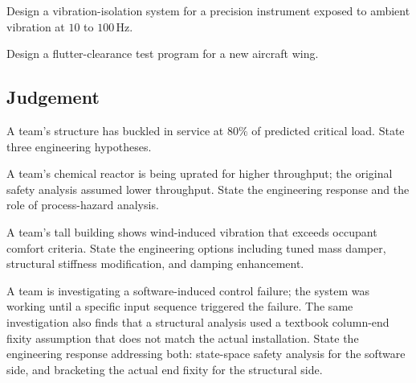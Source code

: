 \begin{exercise}
Design a vibration-isolation system for a precision instrument exposed to ambient vibration at $10$ to $100\,\text{Hz}$.
\end{exercise}

\begin{exercise}
Design a flutter-clearance test program for a new aircraft wing.
\end{exercise}

\subsection*{Judgement}

\begin{exercise}
A team's structure has buckled in service at $80\%$ of predicted critical load. State three engineering hypotheses.
\end{exercise}

\begin{exercise}
A team's chemical reactor is being uprated for higher throughput; the original safety analysis assumed lower throughput. State the engineering response and the role of process-hazard analysis.
\end{exercise}

\begin{exercise}
A team's tall building shows wind-induced vibration that exceeds occupant comfort criteria. State the engineering options including tuned mass damper, structural stiffness modification, and damping enhancement.
\end{exercise}

\begin{exercise}
A team is investigating a software-induced control failure; the system was working until a specific input sequence triggered the failure. The same investigation also finds that a structural analysis used a textbook column-end fixity assumption that does not match the actual installation. State the engineering response addressing both: state-space safety analysis for the software side, and bracketing the actual end fixity for the structural side.
\end{exercise}
